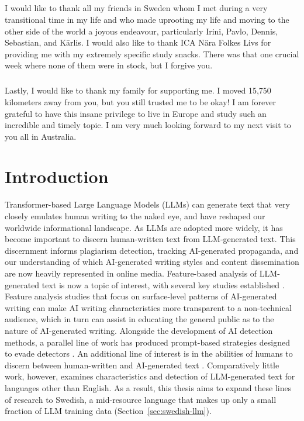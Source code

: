 \documentclass[thesis]{cluu}
\begin{document}
\paragraph{}
I would like to thank all my friends in Sweden whom I met during a very transitional time in my life and who made uprooting my life and moving to the other side of the world a joyous endeavour, particularly Irini, Pavlo, Dennis, Sebastian, and Kārlis. I would also like to thank ICA Nära Folkes Livs for providing me with my extremely specific study snacks. There was that one crucial week where none of them were in stock, but I forgive you.
\paragraph{}
Lastly, I would like to thank my family for supporting me. I moved 15,750 kilometers away from you, but you still trusted me to be okay! I am forever grateful to have this insane privilege to live in Europe and study such an incredible and timely topic. I am very much looking forward to my next visit to you all in Australia.

\chapter{Introduction}

Transformer-based Large Language Models (LLMs) can generate text that very closely emulates human writing to the naked eye, and have reshaped our worldwide informational landscape. As LLMs are adopted more widely, it has become important to discern human-written text from LLM-generated text. This discernment informs plagiarism detection, tracking AI-generated propaganda, and our understanding of which AI-generated writing styles and content dissemination are now heavily represented in online media. Feature-based analysis of LLM-generated text is now a topic of interest, with several key studies established  \parencite{liao2023differentiating, guo2023closechatgpthumanexperts, tang2023sciencedetectingllmgeneratedtexts, munoz-ortiz2024contrasting}. Feature analysis studies that focus on surface-level patterns of AI-generated writing can make AI writing characteristics more transparent to a non-technical audience, which in turn can assist in educating the general public as to the nature of AI-generated writing. Alongside the development of AI detection methods, a parallel line of work has produced prompt-based strategies designed to evade detectors \parencite{krishna2023paraphrasing, lu2024sico, cheng2025adversarialparaphrasinguniversalattack}. An additional line of interest is in the abilities of humans to discern between human-written and AI-generated text \parencite{clark2021all, doruetal}. Comparatively little work, however, examines characteristics and detection of LLM-generated text for languages other than English. As a result, this thesis aims to expand these lines of research to Swedish, a mid-resource language that makes up only a small fraction of LLM training data (Section~\ref{sec:swedish-llm}).
\end{document}
